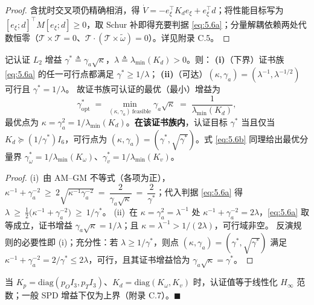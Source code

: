 \begin{proof}
含扰时交叉项仍精确相消，得 $\dot V=-e_\xi^\top K_de_\xi+e_\xi^\top d$；将性能目标写为 $[e_\xi;d]^\top M[e_\xi;d]\ge0$，取 Schur 补即得充要判据 \eqref{eq:5.6a}；分量解耦依赖两处代数恒零（$\mathcal T\times\mathcal T=0$、$\mathcal T\cdot(\mathcal T\times\tilde\omega)=0$）。详见附录 C.5。
\end{proof}

\renewcommand{\thetheorem}{3(c$'$)}%
\begin{theorem}\label{thm:3c2}
记认证 $L_2$ 增益 $\gamma^{*}\triangleq\gamma_a\sqrt{\kappa}$，$\lambda\triangleq\lambda_{\min}(K_d)>0$。则：
\textbf{(i)}（下界）证书族 \eqref{eq:5.6a} 的任一可行点都满足 $\gamma^{*}\ge1/\lambda$；
\textbf{(ii)}（可达）$(\kappa,\gamma_a)=(\lambda^{-1},\lambda^{-1/2})$ 可行且 $\gamma^{*}=1/\lambda$。
故证书族可认证的最优（最小）增益为
\begin{equation}
\gamma^{*}_{\mathrm{opt}}\;=\;\min_{(\kappa,\gamma_a)\ \mathrm{feasible}}\gamma_a\sqrt{\kappa}\;=\;\frac{1}{\lambda_{\min}(K_d)} ,
\tag{5.6c}\label{eq:5.6c}
\end{equation}
最优点为 $\kappa=\gamma_a^2=1/\lambda_{\min}(K_d)$。\textbf{在该证书族内}，认证目标 $\gamma^{*}$ 当且仅当 $K_d\succeq(1/\gamma^{*})I_6$，可行点为 $(\kappa,\gamma_a)=(\gamma^{*},\sqrt{\gamma^{*}})$。式 \eqref{eq:5.6b} 同理给出最优分量界 $\gamma^{*}_\omega=1/\lambda_{\min}(K_\omega)$、$\gamma^{*}_v=1/\lambda_{\min}(K_v)$。
\end{theorem}

\begin{proof}
(i)~由 AM--GM 不等式（各项为正），$\kappa^{-1}+\gamma_a^{-2}\ \ge\ 2\sqrt{\kappa^{-1}\gamma_a^{-2}}\ =\ \dfrac{2}{\gamma_a\sqrt{\kappa}}\ =\ \dfrac{2}{\gamma^{*}}$；代入判据 \eqref{eq:5.6a} 得 $\lambda\ \ge\ \tfrac12\bigl(\kappa^{-1}+\gamma_a^{-2}\bigr)\ \ge\ 1/\gamma^{*}$。
(ii)~在 $\kappa=\gamma_a^2=\lambda^{-1}$ 处 $\kappa^{-1}+\gamma_a^{-2}=2\lambda$，\eqref{eq:5.6a} 取等成立，证书增益 $\gamma_a\sqrt{\kappa}=1/\lambda$；且 $\kappa=\lambda^{-1}>1/(2\lambda)$，可行域非空。
反演规则的必要性即 (i)；充分性：若 $\lambda\ge1/\gamma^{*}$，则点 $(\kappa,\gamma_a)=(\gamma^{*},\sqrt{\gamma^{*}})$ 满足 $\kappa^{-1}+\gamma_a^{-2}=2/\gamma^{*}\le2\lambda$，可行，且其证书增益恰为 $\gamma_a\sqrt{\kappa}=\gamma^{*}$。
\end{proof}

\begin{remark}
当 $K_p=\mathrm{diag}(p_OI_3,p_TI_3)$、$K_d=\mathrm{diag}(K_\omega,K_v)$ 时，认证值等于线性化 $H_\infty$ 范数；一般 SPD 增益下仅为上界（附录 C.7）。$\blacksquare$
\end{remark}


